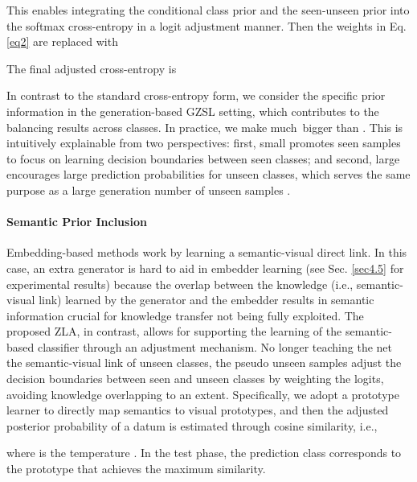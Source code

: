 \documentclass{article}
\begin{document}
    
	This enables integrating the conditional class prior  and the seen-unseen prior  into the softmax cross-entropy in a logit adjustment manner. Then the weights in Eq. \ref{eq2} are replaced with

    
	The final adjusted cross-entropy is
	
    
In contrast to the standard cross-entropy form, we consider the specific prior information in the generation-based GZSL setting, which contributes to the balancing results across classes. In practice, we make  much bigger than . This is intuitively explainable from two perspectives: first, small  promotes seen samples to focus on learning decision boundaries between seen classes; and second, large  encourages large prediction probabilities for unseen classes, which serves the same purpose as a large generation number of unseen samples \cite{xian2018feature,han2021contrastive}.
	
\paragraph{Semantic Prior Inclusion}
Embedding-based methods \cite{li2019rethinking,skorokhodov2020class} work by learning a semantic-visual direct link. In this case, an extra generator is hard to aid in embedder learning (see Sec. \ref{sec4.5} for experimental results) because the overlap between the knowledge (i.e., semantic-visual link) learned by the generator and the embedder results in semantic information crucial for knowledge transfer not being fully exploited. The proposed ZLA, in contrast, allows for supporting the learning of the semantic-based classifier through an adjustment mechanism. No longer teaching the net the semantic-visual link of unseen classes, the pseudo unseen samples adjust the decision boundaries between seen and unseen classes by weighting the logits, avoiding knowledge overlapping to an extent. Specifically, we adopt a prototype learner  \cite{li2019rethinking,skorokhodov2020class} to directly map semantics to visual prototypes, and then the adjusted posterior probability of a datum  is estimated through cosine similarity, i.e.,
\vspace{-1ex}
	
	where  is the temperature \cite{hinton2015distilling}. In the test phase, the prediction class  corresponds to the prototype that achieves the maximum similarity.
	
\end{document}
